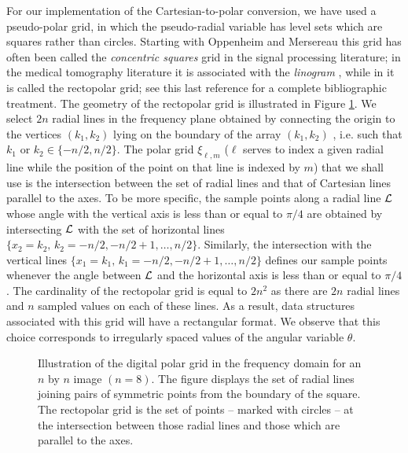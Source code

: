 For our implementation of the Cartesian-to-polar
conversion, we have used a pseudo-polar
grid, in which the pseudo-radial variable has level sets which are squares
rather than circles. Starting with Oppenheim and Mersereau
\cite{MERSEREAU} this grid has often been called the {\it concentric
squares} grid in the signal processing literature; in the medical
tomography literature it is associated with the {\it linogram}
\cite{cur:edholm87,cur:edholm88}, while
in \cite{cur:averbuch01} it is called the rectopolar grid; see this  last
reference for a complete bibliographic treatment.  The geometry of the
rectopolar  grid is illustrated in Figure \ref{fig_radon}. We select $2
n$ radial lines in the frequency plane obtained by connecting the
origin to the vertices
$(k_1,k_2)$ lying on the boundary of the array $(k_1, k_2)$ , i.e. such
that $k_1$ or $k_2 \in \{-n/2, n/2\}$. The polar grid
$\xi_{\ell,m}$ ($\ell$ serves to index a given radial line while the
position of the point on that line is indexed by $m$) that we shall use
is the intersection between the set of radial lines and that of
Cartesian lines parallel to the axes.  To be more specific, the sample
points along a radial line ${\cal L}$ whose angle with the vertical
axis is less than or equal to $\pi/4$ are obtained by intersecting ${\cal
      L}$ with the set of horizontal lines $\{x_2 = k_2, \, k_2 = -n/2,
-n/2 + 1, \ldots, n/2\}$.  Similarly, the intersection with the
vertical lines $\{x_1 = k_1, \, k_1 = -n/2, -n/2 + 1, \ldots, n/2\}$
defines our sample points whenever the angle between ${\cal L}$ and the
horizontal axis is less than or equal to $\pi/4$.  The cardinality of the
rectopolar grid is equal to $2 n^2$ as there are $2 n$ radial lines and
$n$ sampled values on each of these lines. As a result,  data
structures associated with this grid will have a rectangular format. We
observe that this choice corresponds to irregularly spaced values of
the angular variable $\theta$.

\begin{figure}[htb]
\centerline{
\hbox{}
}
\caption{Illustration of the digital polar grid in the frequency domain for
          an $n$ by $n$ image $(n=8)$. The figure displays the set of
          radial lines joining pairs of symmetric points from the boundary
          of the square. The rectopolar grid is the set of points -- marked with
          circles -- at the intersection between those radial lines and
          those which are parallel to the axes.}
\label{fig_radon}
\end{figure}


